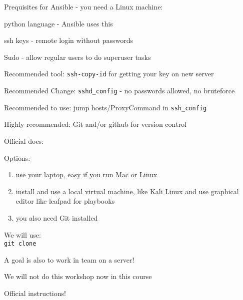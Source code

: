 \documentclass[Screen16to9,17pt]{foils}
\begin{document}


Prequisites for Ansible - you need a Linux machine:
\begin{list2}
\item python language - Ansible uses this
\item ssh keys - remote login without passwords
\item Sudo - allow regular users to do superuser tasks
\item Recommended tool: \verb+ssh-copy-id+ for getting your key on new server
\item Recommended Change: \verb+sshd_config+ - no passwords allowed, no bruteforce
\item Recommended to use: jump hosts/ProxyCommand in \verb+ssh_config+
\item Highly recommended: Git and/or github for version control
\end{list2}

Official docs:\\

Options:
\begin{enumerate}
\item use your laptop, easy if you run Mac or Linux
\item install and use a local virtual machine, like Kali Linux and use graphical editor like leafpad for playbooks
\item you also need Git installed
\end{enumerate}

We will use:\\
\verb+git clone +



\vskip 1cm
\centerline{A goal is also to work in team on a server!}

\centerline{\color{red}\LARGE  We will not do this workshop now in this course}


Official instructions!\\

\end{document}
